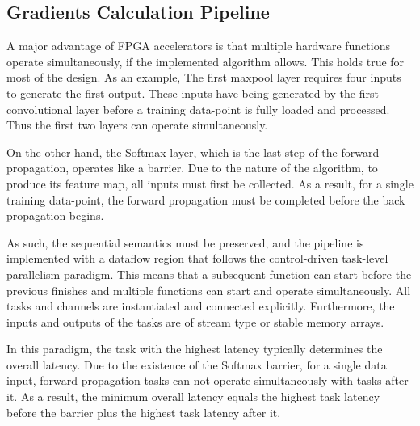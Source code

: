 \subsection{Gradients Calculation Pipeline}
A major advantage of FPGA accelerators is that multiple hardware functions operate simultaneously, if the implemented algorithm allows. This holds true for most of the design. As an example, The first maxpool layer requires four inputs to generate the first output. These inputs have being generated by the first convolutional layer before a training data-point is fully loaded and processed. Thus the first two layers can operate simultaneously. %

On the other hand, the Softmax layer, which is the last step of the forward propagation, operates like a barrier. Due to the nature of the algorithm, to produce its feature map, all inputs must first be collected. As a result, for a single training data-point, the forward propagation must be completed before the back propagation begins. %

As such, the sequential semantics must be preserved, and the pipeline is implemented with a dataflow region that follows the control-driven task-level parallelism paradigm. This means that a subsequent function can start before the previous finishes and multiple functions can start and operate simultaneously. All tasks and channels are instantiated and connected explicitly. Furthermore, the inputs and outputs of the tasks are of stream type or stable memory arrays. %

In this paradigm, the task with the highest latency typically determines the overall latency. Due to the existence of the Softmax barrier, for a single data input, forward propagation tasks can not operate simultaneously with tasks after it. As a result, the minimum overall latency equals the highest task latency before the barrier plus the highest task latency after it. %

